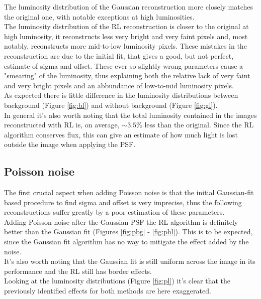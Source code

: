 \documentclass[a4paper]{article}
\begin{document}
\begin{multicols}{2}
			The luminosity distribution of the Gaussian reconstruction more closely matches the original one, with notable exceptions at high luminosities.\\
			
			The luminosity distribution of the RL reconstruction is closer to the original at high luminosity, it reconstructs less very bright and very faint pixels and, most notably, reconstructs more mid-to-low luminosity pixels. These mistakes in the reconstruction are due to the initial fit, that gives a good, but not perfect, estimate of sigma and offset. These ever so slightly wrong parameters cause a "smearing" of the luminosity, thus explaining both the relative lack of very faint and very bright pixels and an abbundance of low-to-mid luminosity pixels.\\
			
			As expected there is little difference in the luminosity distributions between background (Figure \ref{fig:bl}) and without background (Figure \ref{fig:gl}).\\
			
			In general it's also worth noting that the total luminosity contained in the images reconstructed with RL is, on average, $\sim 3.5\%$ less than the original. Since the RL algorithm conserves flux, this can give an estimate of how much light is lost outside the image when applying the PSF.
		
		\newpage
		\subsection{Poisson noise}
			The first crucial aspect when adding Poisson noise is that the initial Gaussian-fit based procedure to find sigma and offset is very imprecise, thus the following reconstructions suffer greatly by a poor estimation of these parameters.\\
			
			Adding Poisson noise after the Gaussian PSF the RL algorithm is definitely better than the Gaussian fit (Figures \ref{fig:pbg} - \ref{fig:phl}). This is to be expected, since the Gaussian fit algorithm has no way to mitigate the effect added by the noise.\\
			It's also worth noting that the Gaussian fit is still uniform across the image in its performance and the RL still has border effects.\\
			
			Looking at the luminosity distributions (Figure \ref{fig:pl}) it's clear that the previously identified effects for both methods are here exaggerated.\\
			

\end{multicols}
\end{document}
